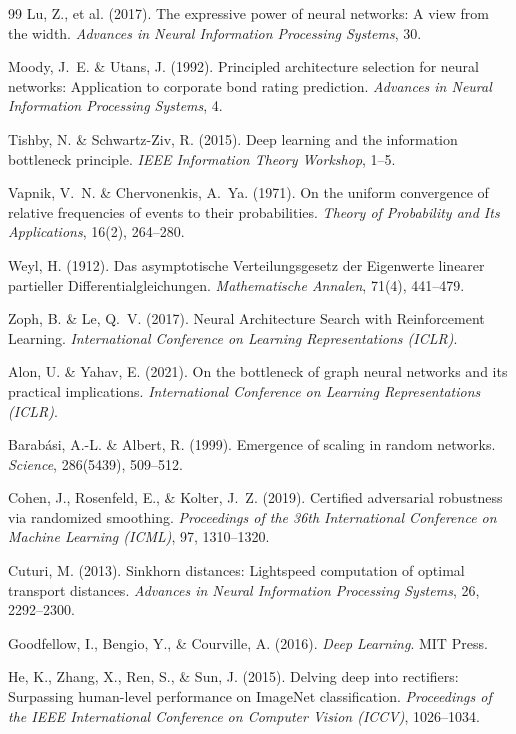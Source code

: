 \documentclass[12pt, a4paper, openany]{report}
\begin{document}
\begin{thebibliography}{99}
Lu, Z., et al. (2017).
The expressive power of neural networks: A view from the width.
\textit{Advances in Neural Information Processing Systems}, 30.

Moody, J.~E. \& Utans, J. (1992).
Principled architecture selection for neural networks:
Application to corporate bond rating prediction.
\textit{Advances in Neural Information Processing Systems}, 4.

Tishby, N. \& Schwartz-Ziv, R. (2015).
Deep learning and the information bottleneck principle.
\textit{IEEE Information Theory Workshop}, 1--5.

Vapnik, V.~N. \& Chervonenkis, A.~Ya. (1971).
On the uniform convergence of relative frequencies of events to their
probabilities.
\textit{Theory of Probability and Its Applications}, 16(2), 264--280.

Weyl, H. (1912).
Das asymptotische Verteilungsgesetz der Eigenwerte linearer partieller
Differentialgleichungen.
\textit{Mathematische Annalen}, 71(4), 441--479.

Zoph, B. \& Le, Q.~V. (2017).
Neural Architecture Search with Reinforcement Learning.
\textit{International Conference on Learning Representations (ICLR)}.

Alon, U. \& Yahav, E. (2021).
On the bottleneck of graph neural networks and its practical implications.
\textit{International Conference on Learning Representations (ICLR)}.

Barabási, A.-L. \& Albert, R. (1999).
Emergence of scaling in random networks.
\textit{Science}, 286(5439), 509--512.

Cohen, J., Rosenfeld, E., \& Kolter, J.~Z. (2019).
Certified adversarial robustness via randomized smoothing.
\textit{Proceedings of the 36th International Conference on Machine Learning
(ICML)}, 97, 1310--1320.

Cuturi, M. (2013).
Sinkhorn distances: Lightspeed computation of optimal transport distances.
\textit{Advances in Neural Information Processing Systems}, 26, 2292--2300.

Goodfellow, I., Bengio, Y., \& Courville, A. (2016).
\textit{Deep Learning}.
MIT Press.

He, K., Zhang, X., Ren, S., \& Sun, J. (2015).
Delving deep into rectifiers: Surpassing human-level performance on ImageNet classification.
\textit{Proceedings of the IEEE International Conference on Computer Vision (ICCV)}, 1026--1034.


\end{thebibliography}
\end{document}

